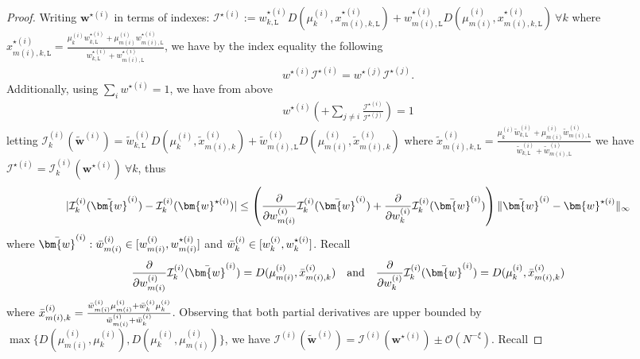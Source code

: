 \documentclass{article}
\begin{document}
\begin{proof}
      Writing $\bm{w}^{\star (i)}$ in terms of indexes: $\mathcal{I}^{\star(i)}:= w^{\star (i)}_{k,\texttt{L}}D(\mu^{(i)}_k,x^{\star(i)}_{m(i),k,\texttt{L}})+w^{\star (i)}_{m(i),\texttt{L}}D(\mu^{(i)}_{m(i)},x^{\star(i)}_{m(i),k,\texttt{L}})\ \forall k$ where $x^{\star(i)}_{m(i),k,\texttt{L}} = \frac{\mu^{(i)}_kw^{\star(i)}_{k,\texttt{L}}+\mu^{(i)}_{m(i)}w^{\star(i)}_{m(i),\texttt{L}}}{w^{\star(i)}_{k,\texttt{L}}+w^{\star(i)}_{m(i),\texttt{L}}}$, we have by the index equality the following
       \begin{align*}
           w^{\star (i)} \mathcal{I}^{\star(i)} =  w^{\star (j)} \mathcal{I}^{\star(j)}.
       \end{align*}
       Additionally, using $\sum_{i} w^{\star (i)}=1$, we have from above
       \begin{align}
           w^{\star (i)}\left(  +\sum_{j\neq i} \frac{ \mathcal{I}^{\star(i)}}{\mathcal{I}^{\star(j)}}\right)=1 \label{eq:wstar}
       \end{align}
       letting $\mathcal{I}_k^{(i)}(\tilde{\bm{w}}^{(i)})=\tilde{w}^{(i)}_{k,\texttt{L}}D(\mu^{(i)}_k,\tilde{x}^{(i)}_{m(i),k})+\tilde{w}^{(i)}_{m(i),\texttt{L}}D(\mu^{(i)}_{m(i)},\tilde{x}^{(i)}_{m(i),k})$ where $\tilde{x}^{(i)}_{m(i),k,\texttt{L}} = \frac{\mu^{(i)}_k\tilde{w}^{(i)}_{k,\texttt{L}}+\mu^{(i)}_{m(i)}\tilde{w}^{(i)}_{m(i),\texttt{L}}}{\tilde{w}^{(i)}_{k,\texttt{L}}+\tilde{w}^{(i)}_{m(i),\texttt{L}}}$ we have $\mathcal{I}^{\star(i)} = \mathcal{I}^{(i)}_k(\bm{w}^{\star(i)})\ \forall k$, thus
       \begin{align*}
           |\mathcal{I}_k^{(i)}(\tilde{\bm{w}}^{(i)})-\mathcal{I}_k^{(i)}(\bm{w}^{\star(i)})|\leq  \left(\dfrac{\partial}{\partial w^{(i)}_{m(i)}}\mathcal{I}_k^{(i)}(\Bar{\bm{w}}^{(i)})+\dfrac{\partial}{\partial w^{(i)}_{k}}\mathcal{I}_k^{(i)}(\Bar{\bm{w}}^{(i)})\right)\|\tilde{\bm{w}}^{(i)}-{\bm{w}}^{\star(i)}\|_{\infty}
       \end{align*}
       where $\Bar{\bm{w}}^{(i)}:\Bar{w}^{(i)}_{m(i)}\in[w^{(i)}_{m(i)},w^{\star (i)}_{m(i)}]$ and $\Bar{w}^{(i)}_{k}\in[w^{(i)}_{k},w^{\star (i)}_{k}]$. Recall
       \begin{align*}
           \dfrac{\partial}{\partial w^{(i)}_{m(i)}}\mathcal{I}_k^{(i)}(\Bar{\bm{w}}^{(i)}) = D(\mu^{(i)}_{m(i)},\Bar{x}^{(i)}_{m(i),k})\quad \text{and}\quad  \dfrac{\partial}{\partial w^{(i)}_{k}}\mathcal{I}_k^{(i)}(\Bar{\bm{w}}^{(i)}) = D(\mu^{(i)}_{k},\Bar{x}^{(i)}_{m(i),k})
       \end{align*}
       where $\Bar{x}^{(i)}_{m(i),k}=\frac{\bar{w}^{(i)}_{m(i)}\mu^{(i)}_{m(i)}+\bar{w}^{(i)}_{k}\mu^{(i)}_{k}}{\bar{w}^{(i)}_{m(i)}+\bar{w}^{(i)}_{k}}$. Observing that both partial derivatives are upper bounded by $\max\{D(\mu^{(i)}_{m(i)},\mu^{(i)}_{k}),D(\mu^{(i)}_{k},\mu^{(i)}_{m(i)})\}$, we have $ \mathcal{I}^{(i)}(\tilde{\bm{w}}^{(i)}) =\mathcal{I}^{(i)}(\bm{w}^{\star(i)}) \pm\mathcal{O}(N^{-\xi})$. Recall

\end{proof}
\end{document}

